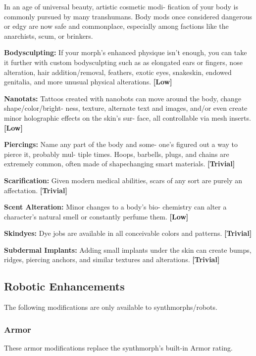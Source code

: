 In an age of universal beauty, artistic cosmetic modi-
fication of your body is commonly pursued by many 
transhumans. Body mods once considered dangerous 
or edgy are now safe and commonplace, especially 
among factions like the anarchists, scum, or brinkers.

\textbf{Bodysculpting:} If your morph's enhanced physique 
isn't enough, you can take it further with custom 
bodysculpting such as as elongated ears or fingers, 
nose alteration, hair addition/removal, feathers, exotic 
eyes, snakeskin, endowed genitalia, and more unusual 
physical alterations. \textbf{[Low]}

\textbf{Nanotats:} Tattoos created with nanobots can 
move around the body, change shape/color/bright-
ness, texture, alternate text and images, and/or even 
create minor holographic effects on the skin's sur-
face, all controllable via mesh inserts. \textbf{[Low]}

\textbf{Piercings:} Name any part of the body and some-
one's figured out a way to pierce it, probably mul-
tiple times. Hoops, barbells, plugs, and chains are 
extremely common, often made of shapechanging 
smart materials. \textbf{[Trivial]}

\textbf{Scarification:} Given modern medical abilities, scars 
of any sort are purely an affectation. \textbf{[Trivial]}

\textbf{Scent Alteration:} Minor changes to a body's bio-
chemistry can alter a character's natural smell or 
constantly perfume them. \textbf{[Low]}

\textbf{Skindyes:} Dye jobs are available in all conceivable 
colors and patterns. \textbf{[Trivial]}

\textbf{Subdermal Implants:} Adding small implants under 
the skin can create bumps, ridges, piercing anchors, 
and similar textures and alterations. \textbf{[Trivial]}

\subsection{Robotic Enhancements}

The following modifications are only available to 
synthmorphs/robots.

\subsubsection{Armor}

These armor modifications replace the synthmorph's 
built-in Armor rating.

